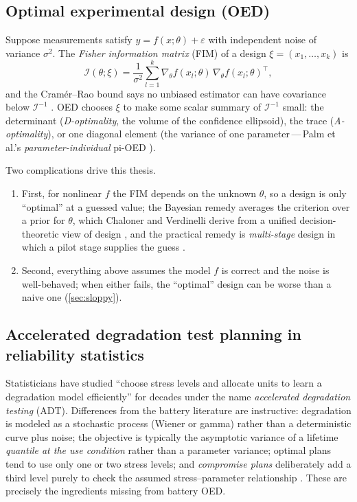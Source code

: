 \documentclass[11pt,letterpaper]{article}
\newcommand{\dash}{\,---\,}
\begin{document}
\subsection{Optimal experimental design (OED)}\label{sec:oed}
Suppose measurements satisfy $y=f(x;\theta)+\varepsilon$ with independent noise of variance $\sigma^2$. The \emph{Fisher information matrix} (FIM) of a design $\xi=(x_1,\ldots,x_k)$ is
\begin{equation}\label{eq:fim}
\mathcal I(\theta;\xi)=\frac1{\sigma^2}\sum_{l=1}^{k}\nabla_\theta f(x_l;\theta)\,\nabla_\theta f(x_l;\theta)^{\!\top},
\end{equation}
and the Cram\'er--Rao bound says no unbiased estimator can have covariance below $\mathcal I^{-1}$ \cite{palm2022,stroebl2026}. OED chooses $\xi$ to make some scalar summary of $\mathcal I^{-1}$ small: the determinant (\emph{D-optimality}, the volume of the confidence ellipsoid), the trace (\emph{A-optimality}), or one diagonal element (the variance of one parameter\dash Palm et al.'s \emph{parameter-individual} pi-OED \cite{palm2022}).

Two complications drive this thesis.
\begin{enumerate}
    \item First, for nonlinear $f$ the FIM depends on the unknown $\theta$, so a design is only ``optimal'' at a guessed value; the Bayesian remedy averages the criterion over a prior for $\theta$, which Chaloner and Verdinelli derive from a unified decision-theoretic view of design \cite{chaloner1995}, and the practical remedy is \emph{multi-stage} design in which a pilot stage supplies the guess \cite{palm2022,stroebl2026}.
    \item Second, everything above assumes the model $f$ is correct and the noise is well-behaved; when either fails, the ``optimal'' design can be worse than a naive one (\cref{sec:sloppy}).
\end{enumerate}

\subsection{Accelerated degradation test planning in reliability statistics}\label{sec:adt}
Statisticians have studied ``choose stress levels and allocate units to learn a degradation model efficiently'' for decades under the name \emph{accelerated degradation testing} (ADT). Differences from the battery literature are instructive: degradation is modeled as a stochastic process (Wiener or gamma) rather than a deterministic curve plus noise; the objective is typically the asymptotic variance of a lifetime \emph{quantile at the use condition} rather than a parameter variance; optimal plans tend to use only one or two stress levels; and \emph{compromise plans} deliberately add a third level purely to check the assumed stress--parameter relationship \cite{limyum2011,amini2018,shen2018}. These are precisely the ingredients missing from battery OED.
\end{document}
